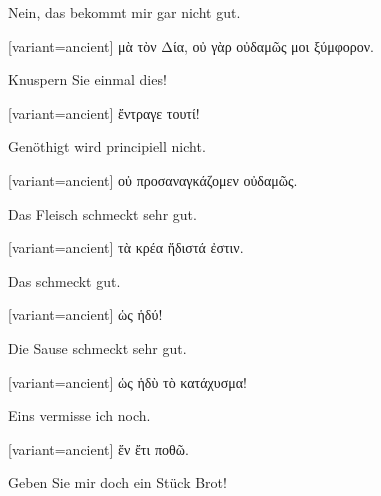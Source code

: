 Nein, das bekommt mir gar nicht gut.

\switchcolumn

\begin{greek}[variant=ancient]%
μὰ τὸν Δία, οὐ γὰρ οὐδαμῶς μοι ξύμφορον.

\end{greek}%
\switchcolumn*

Knus\textcompwordmark{}pern Sie einmal dies!

\switchcolumn

\begin{greek}[variant=ancient]%
ἔντραγε τουτί!

\end{greek}%
\switchcolumn*

Genöthigt wird principiell nicht.

\switchcolumn

\begin{greek}[variant=ancient]%
οὐ προσαναγκάζομεν οὐδαμῶς.

\end{greek}%
\switchcolumn*

Das Fleisch schmeckt sehr gut.

\switchcolumn

\begin{greek}[variant=ancient]%
τὰ κρέα ἥδιστά ἐστιν.

\end{greek}%
\switchcolumn*

Das schmeckt gut.

\switchcolumn

\begin{greek}[variant=ancient]%
ὡς ἡδύ!

\end{greek}%
\switchcolumn*

Die Sause schmeckt sehr gut.

\switchcolumn

\begin{greek}[variant=ancient]%
ὡς ἡδὺ τὸ κατάχυσμα!

\end{greek}%
\switchcolumn*

Eins vermisse ich noch.

\switchcolumn

\begin{greek}[variant=ancient]%
ἕν ἔτι ποθῶ.

\end{greek}%
\switchcolumn*

Geben Sie mir doch ein Stück Brot!


